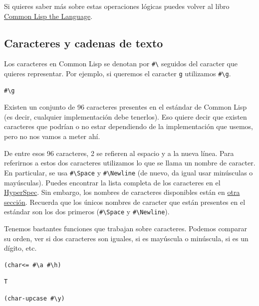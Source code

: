 \documentclass[11pt]{article}
\begin{document}
Si quieres saber más sobre estas operaciones lógicas puedes volver al libro \href{https://www.cs.cmu.edu/Groups/AI/html/cltl/clm/node75.html}{Common Lisp the Language}.


\subsection{Caracteres y cadenas de texto}
\label{sec:org2eed500}

Los caracteres en Common Lisp se denotan por \texttt{\#\textbackslash{}} seguidos del caracter que quieres representar. Por ejemplo, si queremos el caracter \texttt{g} utilizamos \texttt{\#\textbackslash{}g}. 

\begin{verbatim}
#\g
\end{verbatim}

Existen un conjunto de 96 caracteres presentes en el estándar de Common Lisp (es decir, cualquier implementación debe tenerlos). Eso quiere decir que existen caracteres que podrían o no estar dependiendo de la implementación que usemos, pero no nos vamos a meter ahí. 

De entre esos 96 caracteres, 2 se refieren al espacio y a la nueva línea. Para referirnos a estos dos caracteres utilizamos lo que se llama un nombre de caracter. En particular, se usa \texttt{\#\textbackslash{}Space} y \texttt{\#\textbackslash{}Newline} (de nuevo, da igual usar minúsculas o mayúsculas). Puedes encontrar la lista completa de los caracteres en el \href{http://www.lispworks.com/documentation/HyperSpec/Body/02\_ac.htm}{HyperSpec}. Sin embargo, los nombres de caracteres disponibles están en \href{http://www.lispworks.com/documentation/HyperSpec/Body/13\_ag.htm}{otra sección}. Recuerda que los únicos nombres de caracter que están presentes en el estándar son los dos primeros (\texttt{\#\textbackslash{}Space} y \texttt{\#\textbackslash{}Newline}). 

Tenemos bastantes funciones que trabajan sobre caracteres. Podemos comparar su orden, ver si dos caracteres son iguales, si es mayúscula o minúscula, si es un dígito, etc.

\begin{verbatim}
(char<= #\a #\h)
\end{verbatim}

\begin{verbatim}
T
\end{verbatim}


\begin{verbatim}
(char-upcase #\y)
\end{verbatim}
\end{document}
